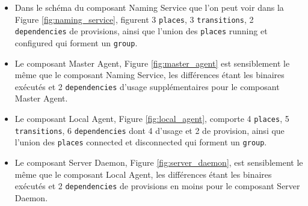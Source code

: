 \documentclass{article}
\newcommand{\ns}{Naming Service\xspace}
\newcommand{\ma}{Master Agent\xspace}
\newcommand{\la}{Local Agent\xspace}
\newcommand{\sed}{Server Daemon\xspace}
\newcommand{\concerto}{Concerto\xspace}
\begin{document}
% 		
%
% 	
%
% 	
%
% 	
%
% 	



\begin{itemize}
	\item Dans le schéma du composant \ns que l'on peut voir dans la Figure
	\ref{fig:naming_service}, figurent 3 \texttt{places}, 3 \texttt{transitions},
	2 \texttt{dependencies} de provisions, ainsi que l'union des \texttt{places}
	\og running \fg et \og configured \fg qui forment un \texttt{group}.\newline

	\item Le composant \ma, Figure \ref{fig:master_agent} est sensiblement le
	même que le composant \ns, les différences étant les binaires exécutés et 2
	\texttt{dependencies} d'usage supplémentaires pour le composant \ma.\newline

	\item Le composant \la, Figure \ref{fig:local_agent}, comporte 4
	\texttt{places}, 5 \texttt{transitions}, 6 \texttt{dependencies} dont 4
	d'usage et 2 de provision, ainsi que l'union des \texttt{places} \og
	connected \fg et \og disconnected \fg qui forment un \texttt{group}.\newline

	\item Le composant \sed, Figure \ref{fig:server_daemon}, est sensiblement le même que
	le composant \la, les différences étant les binaires exécutés et 2
	\texttt{dependencies} de provisions en moins pour le composant \sed.\newline

\end{itemize}
\end{document}
